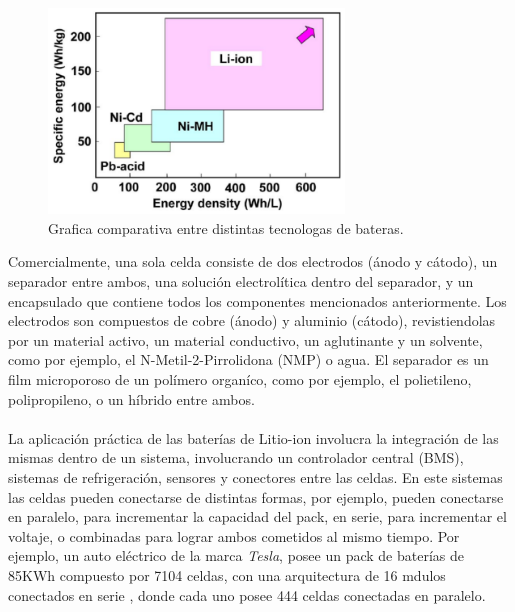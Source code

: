\documentclass[10pt,a4paper]{article}
\begin{document}
    \begin{figure}[h!]
        \begin{center}
            \includegraphics[width=0.7\textwidth]{comparisson-liion.png}
            \caption{Grafica comparativa entre distintas
            tecnologas de bateras.}
            \label{comparisson_batt}
        \end{center}
    \end{figure}

	\noindent Comercialmente, una sola celda consiste de dos electrodos 
    (ánodo y cátodo), un separador entre ambos, una solución electrolítica 
    dentro del separador, y un encapsulado que contiene todos los componentes 
    mencionados anteriormente. Los electrodos son compuestos de cobre (ánodo) 
    y aluminio (cátodo), revistiendolas por un material activo, un material 
    conductivo, un aglutinante y un solvente, como por ejemplo, el 
    N-Metil-2-Pirrolidona (NMP) o agua. El separador es un film microporoso de 
    un polímero organíco, como por ejemplo, el polietileno, polipropileno, o un 
    híbrido entre ambos.\\
	\\
	\noindent La aplicación práctica de las baterías de Litio-ion involucra la 
    integración de las mismas dentro de un sistema, involucrando un controlador 
    central (BMS), sistemas de refrigeración, sensores y conectores entre las 
    celdas. En este sistemas las celdas pueden conectarse de distintas 
    formas, por ejemplo, pueden conectarse en paralelo, para incrementar la 
    capacidad del pack, en serie, para incrementar el voltaje, o combinadas 
    para lograr ambos cometidos al mismo tiempo. Por ejemplo, un auto eléctrico 
    de la marca \emph{Tesla}, posee un pack de baterías de 85KWh compuesto por 
    7104 celdas, con una arquitectura de 16 mdulos conectados en serie
    , donde cada uno posee 444 celdas conectadas en paralelo.
\end{document}
